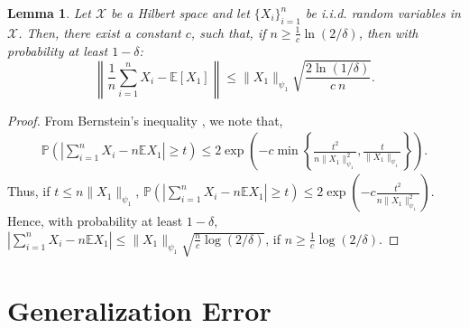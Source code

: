 \documentclass[12pts]{article}
\newtheorem{lemma}[defn]{Lemma}%
\newcommand{\prob}{\mathbb{P}}
\newcommand{\E}{\mathbb{E}}
\begin{document}
\begin{lemma}
 \label{lemi3}
Let $\mathcal{X}$ be a Hilbert space and let $\{X_i\}_{i=1}^n$ be i.i.d. random variables in $\mathcal{X}$. Then, there exist a constant $c$, such that,  if $n \ge \frac{1}{c}\ln(2/\delta)$, then with probability at least $1 - \delta$:
\[
\left\| \frac{1}{n} \sum_{i=1}^{n} X_i - \mathbb{E}[X_1] \right\| \le \|X_1\|_{\psi_1} \sqrt{\frac{2 \ln(1/\delta)}{c \ n}}.
\]
\end{lemma}
\begin{proof}
    From Bernstein's inequality \citep[Theorem 2.9.1]{Vershynin_2026}, we note that, 
    \begin{align}
        \prob\left( \left| \sum_{i=1}^n X_i - n \E X_1\right| \ge  t \right) \le 2 \exp\left(-c \min\left\{\frac{ t^2}{ n \|X_1\|_{\psi_1}^2}, \frac{t}{\|X_1\|_{\psi_1}}\right\}\right).
    \end{align}
    Thus, if $t \le n \|X_1\|_{\psi_1}$, $\prob\left( \left| \sum_{i=1}^n X_i - n \E X_1\right| \ge  t \right) \le 2\exp\left(-c \frac{ t^2}{ n \|X_1\|_{\psi_1}^2} \right)$. Hence, with probability at least $1-\delta$, $\left| \sum_{i=1}^n X_i - n \E X_1\right| \le \|X_1\|_{\psi_1} \sqrt{\frac{n}{c}\log(2/\delta)}$, if $n \ge \frac{1}{c} \log(2/\delta)$.
\end{proof}
\section{Generalization Error}\label{ap_moment_thm}
\end{document}
